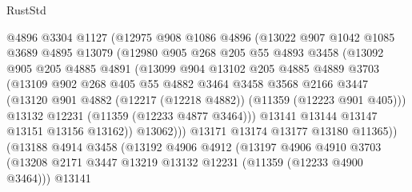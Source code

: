 \begin{lexlean}{RustStd}
\begin{coremodule}
{{{{{{{{{{{{{{{{{{{                    @4896
                    @3304
                    @1127
                    (@12975
                      @908
                      @1086
                      @4896
                      (@13022
                        @907
                        @1042
                        @1085
                        @3689
                        @4895
                        @13079
                        (@12980
                          @905
                          @268
                          @205
                          @55
                          @4893
                          @3458
                          (@13092
                            @905
                            @205
                            @4885
                            @4891
                            (@13099
                              @904
                              @13102
                              @205
                              @4885
                              @4889
                              @3703
                              (@13109
                                @902
                                @268
                                @405
                                @55
                                @4882
                                @3464
                                @3458
                                @3568
                                @2166
                                @3447
                                (@13120
                                  @901
                                  @4882
                                  (@12217 (@12218 @4882))
                                  (@11359 (@12223 @901 @405)))
                                @13132
                                @12231
                                (@11359 (@12233 @4877 @3464)))
                              @13141
                              @13144
                              @13147
                              @13151
                              @13156
                              @13162))
                          @13062)))
                    @13171
                    @13174
                    @13177
                    @13180
                    @11365))
                (@13188
                  @4914
                  @3458
                  (@13192
                    @4906
                    @4912
                    (@13197
                      @4906
                      @4910
                      @3703
                      (@13208 @2171 @3447 @13219 @13132 @12231 (@11359 (@12233 @4900 @3464)))
                      @13141
}}}}}}}}}}}}}}}}}}}
\end{coremodule}
\end{lexlean}
